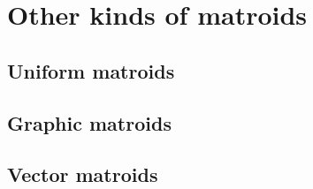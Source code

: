 \skelpars[15]

\section{Other kinds of matroids}
\skelpars[1]

\subsection{Uniform matroids}
\skelpars[4]

\subsection{Graphic matroids}
\skelpars[6]

\subsection{Vector matroids}
\skelpars[7]